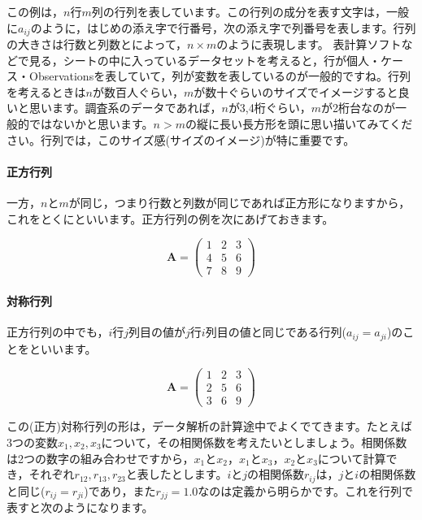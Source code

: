 \documentclass{ltjsbook}
\begin{document}
この例は，$n$行$m$列の行列を表しています。この行列の成分を表す文字は，一般に$a_{ij}$のように，はじめの添え字で行番号，次の添え字で列番号を表します。行列の大きさは行数と列数とによって，$n \times m$のように表現します。
表計算ソフトなどで見る，シートの中に入っているデータセットを考えると，行が個人・ケース・Observationsを表していて，列が変数を表しているのが一般的ですね。行列を考えるときは$n$が数百人ぐらい，$m$が数十ぐらいのサイズでイメージすると良いと思います。調査系のデータであれば，$n$が3,4桁ぐらい，$m$が2桁台なのが一般的ではないかと思います。$n>m$の縦に長い長方形を頭に思い描いてみてください。行列では，このサイズ感(サイズのイメージ)が特に重要です。

\paragraph{正方行列}
一方，$n$と$m$が同じ，つまり行数と列数が同じであれば正方形になりますから，これをとくにといいます。正方行列の例を次にあげておきます。


\begin{equation*}
    \bm{A} =
    \begin{pmatrix}
        1 & 2 & 3 \\
        4 & 5 & 6 \\
        7 & 8 & 9
    \end{pmatrix}
\end{equation*}

\paragraph{対称行列}

正方行列の中でも，$i$行$j$列目の値が$j$行$i$列目の値と同じである行列($a_{ij}=a_{ji}$)のことをといいます。

\begin{equation*}
    \bm{A} =
    \begin{pmatrix}
        1 & 2 & 3 \\
        2 & 5 & 6 \\
        3 & 6 & 9
    \end{pmatrix}
\end{equation*}

この(正方)対称行列の形は，データ解析の計算途中でよくでてきます。たとえば3つの変数$x_1,x_2,x_3$について，その相関係数を考えたいとしましょう。相関係数は2つの数字の組み合わせですから，$x_1$と$x_2$，$x_1$と$x_3$，$x_2$と$x_3$について計算でき，それぞれ$r_{12},r_{13},r_{23}$と表したとします。$i$と$j$の相関係数$r_{ij}$は，$j$と$i$の相関係数と同じ($r_{ij}=r_{ji}$)であり，また$r_{jj}=1.0$なのは定義から明らかです。これを行列で表すと次のようになります。
\end{document}
